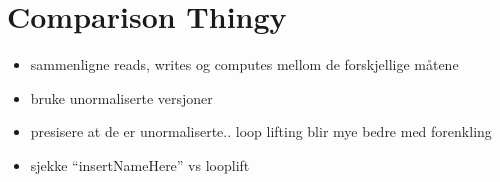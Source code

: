 \section{Comparison Thingy}
\begin{itemize}
  \item sammenligne reads, writes og computes mellom de forskjellige m\aa tene
  \item bruke unormaliserte versjoner
  \item presisere at de er unormaliserte.. loop lifting blir mye bedre med
  forenkling
  \item sjekke ``insertNameHere'' vs looplift 
\end{itemize}